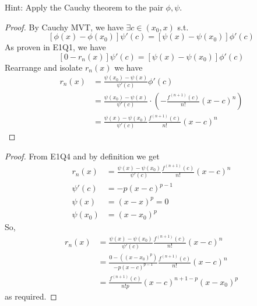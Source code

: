 \documentclass{homework}
\newcommand{\?}{\stackrel{?}{=}}
\theoremstyle{definition}
\begin{document}

Hint: Apply the Cauchy theorem to the pair $\phi,\psi$.

\begin{proof}
    By Cauchy MVT, we have $\exists c\in(x_0,x)$ s.t. \[[\phi(x)-\phi(x_0)]\psi'(c)=[\psi(x)-\psi(x_0)]\phi'(c)\] As proven in E1Q1, we have \[[0-r_n(x)]\psi'(c)=[\psi(x)-\psi(x_0)]\phi'(c)\] Rearrange and isolate $r_n(x)$ we have \begin{align*}
        r_n(x)&=\frac{\psi(x_0)-\psi(x)}{\psi'(c)}\phi'(c)\\
        &=\frac{\psi(x_0)-\psi(x)}{\psi'(c)}\cdot\left( -\frac{f^{(n+1)}(c)}{n!}(x-c)^n \right)\\
        &=\frac{\psi(x)-\psi(x_0)}{\psi'(c)}\frac{f^{(n+1)}(c)}{n!}(x-c)^n
    \end{align*}
\end{proof}


\begin{proof}
    From E1Q4 and by definition we get 
    \begin{align*}
        r_n(x)&=\frac{\psi(x)-\psi(x_0)}{\psi'(c)}\frac{f^{(n+1)}(c)}{n!}(x-c)^n\\
        \psi'(c)&=-p(x-c)^{p-1}\\
        \psi(x)&=(x-x)^p=0\\
        \psi(x_0)&=(x-x_0)^p
    \end{align*}
    So,
    \begin{align*}
        r_n(x)&=\frac{\psi(x)-\psi(x_0)}{\psi'(c)}\frac{f^{(n+1)}(c)}{n!}(x-c)^n\\
        &=\frac{0-((x-x_0)^p)}{-p(x-c)^{p-1}}\frac{f^{(n+1)}(c)}{n!}(x-c)^n\\
        &=\frac{f^{(n+1)}(c)}{n!p}(x-c)^{n+1-p}(x-x_0)^p
    \end{align*}
    as required.
\end{proof}

\end{document}
